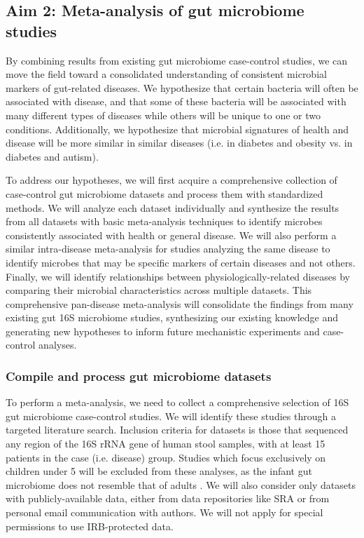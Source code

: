 \documentclass[12pt]{article}
\begin{document}
\subsection{Aim 2: Meta-analysis of gut microbiome studies}\label{sec:aim2}
By combining results from existing gut microbiome case-control 
studies, we can move the field toward a consolidated understanding of 
consistent microbial markers of gut-related diseases. We hypothesize 
that certain bacteria will often be associated with disease, and that 
some of these bacteria will be associated with many different types of 
diseases while others will be unique to one or two conditions. 
Additionally, we hypothesize that microbial signatures  of health and 
disease will be more similar in similar diseases (i.e. in diabetes and 
obesity vs. in diabetes and autism).

To address our hypotheses, we will first acquire a comprehensive
collection of case-control gut microbiome datasets and process them
with standardized methods. We will analyze each dataset individually
and synthesize the results from all datasets with basic meta-analysis 
techniques to identify microbes consistently associated with health or 
general disease. We will also perform a similar intra-disease meta-analysis 
for studies analyzing the same disease to identify microbes
that may be specific markers of certain diseases and not others.
Finally, we will identify relationships between physiologically-related 
diseases by comparing their microbial characteristics across multiple
datasets. This comprehensive pan-disease meta-analysis will
consolidate the findings from many existing gut 16S microbiome studies,
synthesizing our existing knowledge and generating new hypotheses to
inform future mechanistic experiments and case-control analyses.

\subsubsection{Compile and process gut microbiome datasets}
To perform a meta-analysis, we need to collect a 
comprehensive selection of 16S gut microbiome case-control studies. We 
will identify these studies through a targeted literature search.  
Inclusion criteria for datasets is those that sequenced
any region of the 16S rRNA gene of human stool samples, with at least 15 patients in the
case (i.e. disease) group. Studies which focus exclusively on 
children under 5 will be excluded from these analyses, as the infant
gut microbiome does not resemble that of adults \cite{lozupone-meta-2013}.
We will also consider only datasets with 
publicly-available data, either from data repositories like SRA or
from personal email communication with authors. We will not 
apply for special permissions to use IRB-protected data. 
\end{document}
